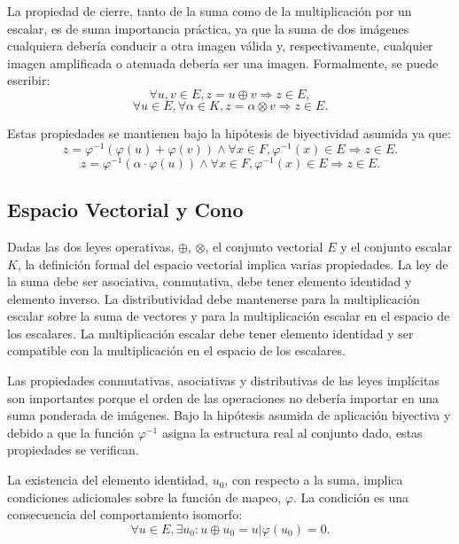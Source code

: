 La propiedad de cierre, tanto de la suma como de la multiplicación por un escalar, es de suma importancia práctica, ya que la suma de dos imágenes cualquiera debería conducir a otra imagen válida y, respectivamente, cualquier imagen amplificada o atenuada debería ser una imagen. Formalmente, se puede escribir:
\begin{equation}
	\forall u,v \in E, z = u \oplus v \Rightarrow z \in E,
\end{equation}
\begin{equation}
	\forall u \in E, \forall \alpha \in K, z=\alpha \otimes v \Rightarrow z \in E.
\end{equation}

Estas propiedades se mantienen bajo la hipótesis de biyectividad asumida ya que: 
\begin{equation}
	z=\varphi^{-1}(\varphi(u)+\varphi(v)) \land \forall x \in F, \varphi^{-1}(x) \in E \Rightarrow z \in E.
\end{equation}
\begin{equation}
	z=\varphi^{-1}(\alpha\cdot\varphi(u)) \land \forall x \in F, \varphi^{-1}(x) \in E \Rightarrow z \in E.
\end{equation}

\subsection{Espacio Vectorial y Cono}
Dadas las dos leyes operativas, $\oplus$, $\otimes$, el conjunto vectorial $E$ y el conjunto escalar $K$, la definición formal del espacio vectorial implica varias propiedades. La ley de la suma debe ser asociativa, conmutativa, debe tener elemento identidad y elemento inverso. La distributividad debe mantenerse para la multiplicación escalar sobre la suma de vectores y para la multiplicación escalar en el espacio de los escalares. La multiplicación escalar debe tener elemento identidad y ser compatible con la multiplicación en el espacio de los escalares.

Las propiedades conmutativas, asociativas y distributivas de las leyes implícitas son importantes porque el orden de las operaciones no debería importar en una suma ponderada de imágenes. Bajo la hipótesis asumida de aplicación biyectiva y debido a que la función $\varphi^{-1}$ asigna la estructura real al conjunto dado, estas propiedades se verifican.

La existencia del elemento identidad, $u_0$, con respecto a la suma, implica condiciones adicionales sobre la función de mapeo, $\varphi$. La condición es una consecuencia del comportamiento isomorfo:
\begin{equation}
	\forall u\in E, \exists u_0 : u \oplus u_0 = u | \varphi(u_0)=0.
\end{equation}


